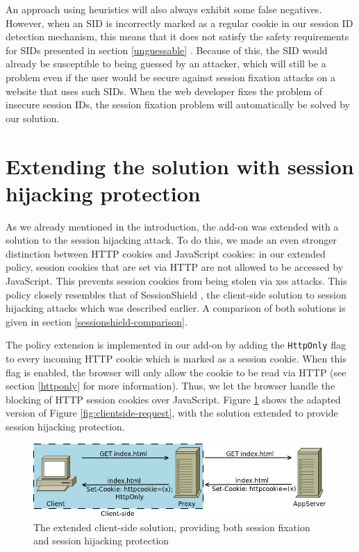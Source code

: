 An approach using heuristics will also always exhibit some false negatives. However, when an SID is incorrectly marked as a regular cookie in our session ID detection mechanism, this means that it does not satisfy the safety requirements for SIDs presented in section \ref{unguessable} \cite{Nikiforakis2010}. Because of this, the SID would already be susceptible to being guessed by an attacker, which will still be a problem even if the user would be secure against session fixation attacks on a website that uses such SIDs. When the web developer fixes the problem of insecure session IDs, the session fixation problem will automatically be solved by our solution.

\section{Extending the solution with session hijacking protection}

As we already mentioned in the introduction, the add-on was extended with a solution to the session hijacking attack. To do this, we made an even stronger distinction between HTTP cookies and JavaScript cookies: in our extended policy, session cookies that are set via HTTP are not allowed to be accessed by JavaScript. This prevents session cookies from being stolen via \gls{xss} attacks. This policy closely resembles that of SessionShield \cite{Nikiforakis2010}, the client-side solution to session hijacking attacks which was described earlier. A comparison of both solutions is given in section \ref{sessionshield-comparison}.

The policy extension is implemented in our add-on by adding the \texttt{HttpOnly} flag to every incoming HTTP cookie which is marked as a session cookie. When this flag is enabled, the browser will only allow the cookie to be read via HTTP (see section \ref{httponly} for more information). Thus, we let the browser handle the blocking of HTTP session cookies over JavaScript. Figure \ref{fig:clientside-httponly} shows the adapted version of Figure \ref{fig:clientside-request}, with the solution extended to provide session hijacking protection.

\begin{figure}[htb]
	\centering
	\includegraphics[width=.7\textwidth]{img/clientside-proxy-3.png}
	\caption[The extended client-side solution]{The extended client-side solution, providing both session fixation and session hijacking protection}
	\label{fig:clientside-httponly}
\end{figure}
 
